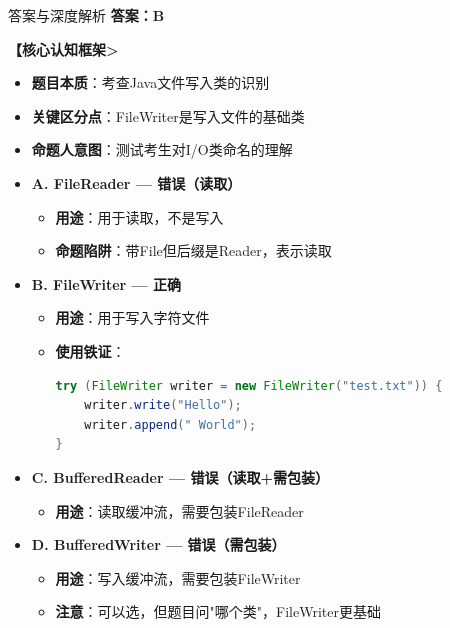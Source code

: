 \documentclass[12pt, a4paper]{ctexart}
\begin{document}
\begin{bluebox}{答案与深度解析}
	\textbf{答案：B}

	\textbf{【核心认知框架>}
	\begin{itemize}[label={}, leftmargin=*, nosep]
		\item \textbf{题目本质}：考查Java文件写入类的识别
		\item \textbf{关键区分点}：FileWriter是写入文件的基础类
		\item \textbf{命题人意图}：测试考生对I/O类命名的理解
	\end{itemize}

	\begin{itemize}[label={}, nosep]
		\item \textbf{A. FileReader — 错误（读取）}
		\begin{itemize}[label={}, leftmargin=*, nosep]
			\item \textbf{用途}：用于读取，不是写入
			\item \textbf{命题陷阱}：带File但后缀是Reader，表示读取
		\end{itemize}

		\item \textbf{B. FileWriter — 正确}
		\begin{itemize}[label={}, leftmargin=*, nosep]
			\item \textbf{用途}：用于写入字符文件
			\item \textbf{使用铁证}：
			      \begin{lstlisting}[language=Java]
try (FileWriter writer = new FileWriter("test.txt")) {
    writer.write("Hello");
    writer.append(" World");
}
      \end{lstlisting}
		\end{itemize}

		\item \textbf{C. BufferedReader — 错误（读取+需包装）}
		\begin{itemize}[label={}, leftmargin=*, nosep]
			\item \textbf{用途}：读取缓冲流，需要包装FileReader
		\end{itemize}

		\item \textbf{D. BufferedWriter — 错误（需包装）}
		\begin{itemize}[label={}, leftmargin=*, nosep]
			\item \textbf{用途}：写入缓冲流，需要包装FileWriter
			\item \textbf{注意}：可以选，但题目问"哪个类"，FileWriter更基础
		\end{itemize}
	\end{itemize}


\end{bluebox}
\end{document}
